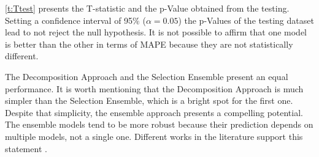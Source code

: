 \autoref{t:Ttest} presents the T-statistic and the p-Value obtained from the testing. Setting a confidence interval of 95\% (\begin{math}\alpha = 0.05\end{math}) the p-Values of the testing dataset lead to not reject the null hypothesis. It is not possible to affirm that one model is better than the other in terms of \ac{MAPE} because they are not statistically different.

% 

The Decomposition Approach and the Selection Ensemble present an equal performance. It is worth mentioning that the Decomposition Approach is much simpler than the Selection Ensemble, which is a bright spot for the first one. Despite that simplicity, the ensemble approach presents a compelling potential. The ensemble models tend to be more robust because their prediction depends on multiple models, not a single one. Different works in the literature support this statement \cite{Nourani2018, Nourani2021, Lu2020}.
